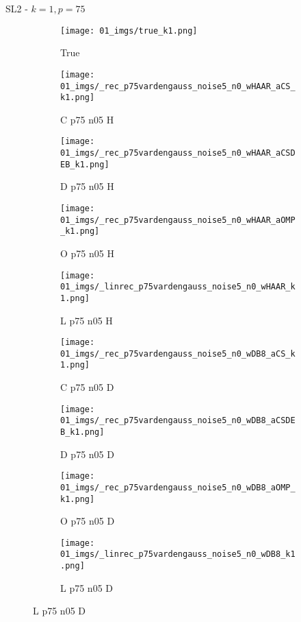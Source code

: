 \begin{frame}{SL2 - $k=1,p=75$}{}
\begin{figure}
\begin{subfigure}{0.1\textwidth}
\texttt{[image: 01\_imgs/true\_k1.png]}
\caption*{\Tiny True}
\end{subfigure}
\begin{subfigure}{0.1\textwidth}
\texttt{[image: 01\_imgs/\_rec\_p75vardengauss\_noise5\_n0\_wHAAR\_aCS\_k1.png]}
\caption*{\Tiny C p75 n05 H}
\end{subfigure}
\begin{subfigure}{0.1\textwidth}
\texttt{[image: 01\_imgs/\_rec\_p75vardengauss\_noise5\_n0\_wHAAR\_aCSDEB\_k1.png]}
\caption*{\Tiny D p75 n05 H}
\end{subfigure}
\begin{subfigure}{0.1\textwidth}
\texttt{[image: 01\_imgs/\_rec\_p75vardengauss\_noise5\_n0\_wHAAR\_aOMP\_k1.png]}
\caption*{\Tiny O p75 n05 H}
\end{subfigure}
\begin{subfigure}{0.1\textwidth}
\texttt{[image: 01\_imgs/\_linrec\_p75vardengauss\_noise5\_n0\_wHAAR\_k1.png]}
\caption*{\Tiny L p75 n05 H}
\end{subfigure}
\begin{subfigure}{0.1\textwidth}
\texttt{[image: 01\_imgs/\_rec\_p75vardengauss\_noise5\_n0\_wDB8\_aCS\_k1.png]}
\caption*{\Tiny C p75 n05 D}
\end{subfigure}
\begin{subfigure}{0.1\textwidth}
\texttt{[image: 01\_imgs/\_rec\_p75vardengauss\_noise5\_n0\_wDB8\_aCSDEB\_k1.png]}
\caption*{\Tiny D p75 n05 D}
\end{subfigure}
\begin{subfigure}{0.1\textwidth}
\texttt{[image: 01\_imgs/\_rec\_p75vardengauss\_noise5\_n0\_wDB8\_aOMP\_k1.png]}
\caption*{\Tiny O p75 n05 D}
\end{subfigure}
\begin{subfigure}{0.1\textwidth}
\texttt{[image: 01\_imgs/\_linrec\_p75vardengauss\_noise5\_n0\_wDB8\_k1.png]}
\caption*{\Tiny L p75 n05 D}
\end{subfigure}

\vspace{5pt}


\end{figure}
\end{frame}
